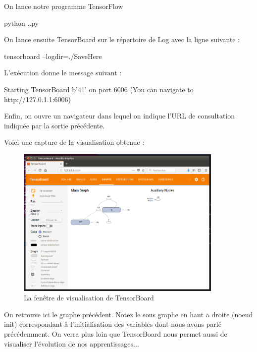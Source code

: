 \documentclass[a4paper,11pt]{book}
\begin{document}




On lance notre programme TensorFlow 
\begin{mybash}
python .\calculTensorFlowWithTensorBoard.py
\end{mybash}
On lance ensuite TensorBoard sur le répertoire de Log avec la ligne suivante :

\begin{mybash}
tensorboard --logdir=./SaveHere
\end{mybash}


L’exécution donne le message suivant :
\begin{myoutput}
Starting TensorBoard b'41' on port 6006
(You can navigate to http://127.0.1.1:6006)
\end{myoutput}


Enfin, on ouvre un navigateur dans lequel on indique l'URL de consultation indiquée par la sortie précédente.

Voici une capture de la visualisation obtenue :
\begin{figure}[H]

\begin{center}
\includegraphics[width=10cm]{./figures/premierTensorBoard.png} 
\end{center}
\caption{La fenêtre de visualisation de TensorBoard}
\end{figure}

On retrouve ici le graphe précédent. Notez le sous graphe en haut a droite (noeud init) correspondant à l'initialisation des variables dont nous avons parlé précédemment.
On verra plus loin que TensorBoard nous permet aussi de visualiser l'évolution de nos apprentissages...
\end{document}
